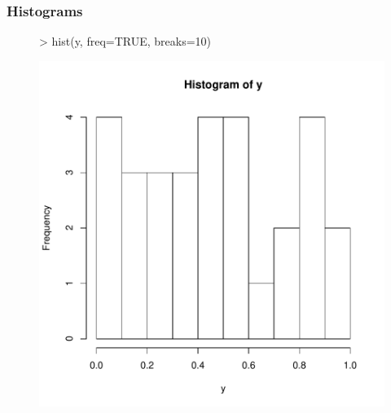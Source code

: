 \documentclass{beamer}
\begin{document}
\begin{frame}[containsverbatim]  
	\frametitle{Histograms}
\scriptsize
\begin{figure}
  \centering
\begin{Schunk}
\begin{Sinput}
> hist(y, freq=TRUE, breaks=10)
\end{Sinput}
\end{Schunk}
\includegraphics{fig--017}
\label{fig:hist}
\end{figure}
\end{frame}
\end{document}
